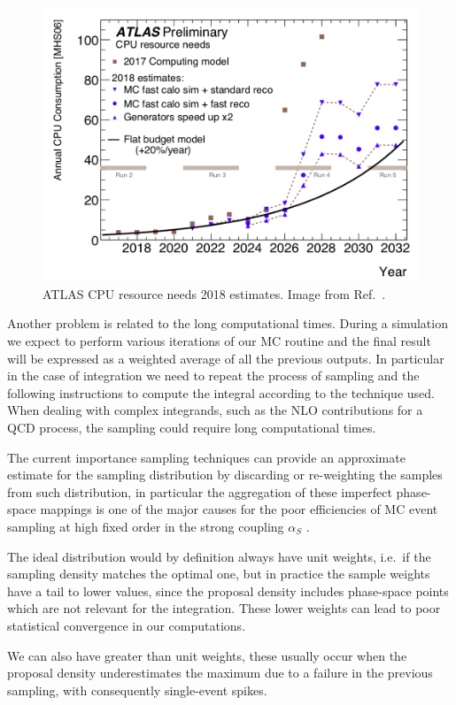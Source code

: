 \documentclass[../main/main.tex]{subfiles}
\begin{document}
\begin{figure}[h]
	\centering
	\includegraphics[width = 12cm]{../images/CPU-cost.png}
	\caption{ATLAS CPU resource needs 2018 estimates. Image from Ref.~\cite{ATL-SOFT-PUB-2021-001}.}
	\label{CPU cost}
\end{figure}

Another problem is related to the long computational times.
During a simulation we expect to perform various iterations of our MC routine and the final result 
will be expressed as a weighted average of all the previous outputs.
In particular in the case of integration we need to repeat the process of sampling and the following instructions to compute the integral according to the technique used. When dealing with complex integrands, such as the NLO contributions for a QCD process, the sampling could require long computational times.

The current importance sampling techniques can provide an approximate estimate for the sampling distribution by discarding or re-weighting
the samples from such distribution, in particular the aggregation of these imperfect phase-space mappings is one of the major causes for
the poor efficiencies of MC event sampling at high fixed order in the strong coupling $\alpha_S$ .

The ideal distribution would by definition always have unit weights, i.e.\ if the sampling density matches the optimal one, but in practice 
the sample weights have a tail to lower values, since the proposal density includes phase-space points which are not relevant for the integration.
These lower weights can lead to poor statistical convergence in our computations.

 We can also have greater than unit weights, these usually occur when the proposal density underestimates the maximum due to a failure in the
previous sampling, with consequently single-event spikes.
\end{document}
